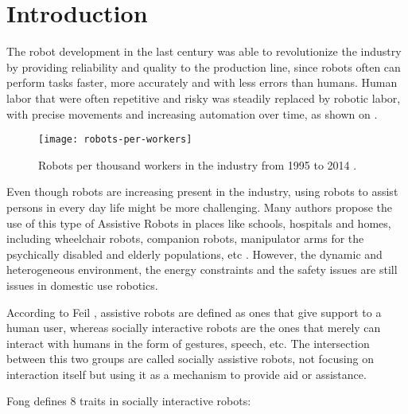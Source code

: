 \chapter{Introduction}\label{chp:intro}

The robot development in the last century was able to revolutionize the industry by providing reliability and quality to the production line, since robots often can perform tasks faster, more accurately and with less errors than humans. Human labor that were often repetitive and risky was steadily replaced by robotic labor, with precise movements and increasing automation over time, as shown on .

\begin{figure}[!ht]
    \centering
    \texttt{[image: robots-per-workers]}
    \caption{Robots per thousand workers in the industry from 1995 to 2014 \cite{dauth2017german}.}
    \label{fig:robots-per-workers}
\end{figure}

Even though robots are increasing present in the industry, using robots to assist persons in every day life might be more challenging. Many authors propose the use of this type of Assistive Robots in places like schools, hospitals and homes, including wheelchair robots, companion robots, manipulator arms for the psychically disabled and elderly populations, etc \cite{feil2005defining}. However, the dynamic and heterogeneous environment, the energy constraints and the safety issues are still issues in domestic use robotics.

According to Feil \cite{feil2005defining}, assistive robots are defined as ones that give support to a human user, whereas socially interactive robots are the ones that merely can interact with humans in the form of gestures, speech, etc. The intersection between this two groups are called socially assistive robots, not focusing on interaction itself but using it as a mechanism to provide aid or assistance.

Fong \cite{fong2003survey} defines 8 traits in socially interactive robots:

